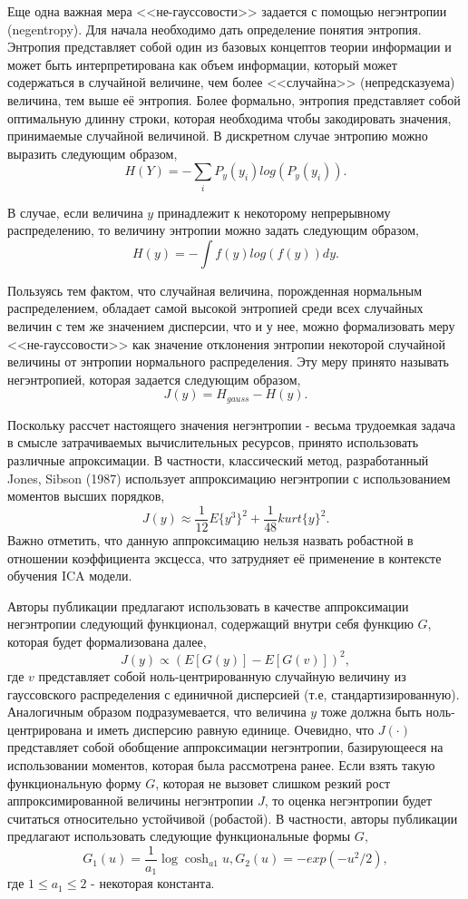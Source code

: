 \documentclass[runningheads]{llncs}
\begin{document}
Еще одна важная мера <<не-гауссовости>> задается с помощью негэнтропии (negentropy). Для начала необходимо дать определение понятия энтропия. Энтропия представляет собой один из базовых концептов теории информации и может быть интерпретирована как объем информации, который может содержаться в случайной величине, чем более <<случайна>> (непредсказуема) величина, тем выше её энтропия. Более формально, энтропия представляет собой оптимальную длинну строки, которая необходима чтобы закодировать значения, принимаемые случайной величиной. В дискретном случае энтропию можно выразить следующим образом, $$H(Y) = -\sum_i P_y(y_i) log(P_y(y_i)).$$\par
В случае, если величина $y$ принадлежит к некоторому непрерывному распределению, то величину энтропии можно задать следующим образом, $$H(y) = -\int f(y)log(f(y))dy.$$ \par
Пользуясь тем фактом, что случайная величина, порожденная нормальным распределением, обладает самой высокой энтропией среди всех случайных величин с тем же значением дисперсии, что и у нее, можно формализовать меру <<не-гауссовости>> как значение отклонения энтропии некоторой случайной величины от энтропии нормального распределения. Эту меру принято называть негэнтропией, которая задается следующим образом, $$J(y) = H_{gauss} - H(y).$$ \par
Поскольку рассчет настоящего значения негэнтропии - весьма трудоемкая задача в смысле затрачиваемых вычислительных ресурсов, принято использовать различные апроксимации. В частности, классический метод, разработанный Jones, Sibson (1987) использует аппроксимацию негэнтропии с использованием моментов высших порядков, $$J(y) \approx \frac{1}{12}E\{y^3\}^2 + \frac{1}{48}kurt\{y\}^2.$$ Важно отметить, что данную аппроксимацию нельзя назвать робастной в отношении коэффициента эксцесса, что затрудняет её применение в контексте обучения ICA модели. \par
Авторы публикации \cite{fastica} предлагают использовать в качестве аппроксимации негэнтропии следующий функционал, содержащий внутри себя функцию $G$, которая будет формализована далее,
$$J(y) \propto (E[G(y)] - E[G(v)])^2,$$
где $v$ представляет собой ноль-центрированную случайную величину из гауссовского распределения с единичной дисперсией (т.е, стандартизированную). Аналогичным образом подразумевается, что величина $y$ тоже должна быть ноль-центрирована и иметь дисперсию равную единице. Очевидно, что $J(\cdot)$ представляет собой обобщение аппроксимации негэнтропии, базирующееся на использовании моментов, которая была рассмотрена ранее. Если взять такую функциональную форму $G$, которая не вызовет слишком резкий рост аппроксимированной величины негэнтропии $J$, то оценка негэнтропии будет считаться относительно устойчивой (робастой). В частности, авторы публикации предлагают использовать следующие функциональные формы $G,$
$$G_1(u) = \frac{1}{a_1}\log \cosh _{a1} u, G_2(u) = -exp(-u^2 / 2),$$
где $1 \leq a_1 \leq 2$ - некоторая константа.\par
\end{document}
